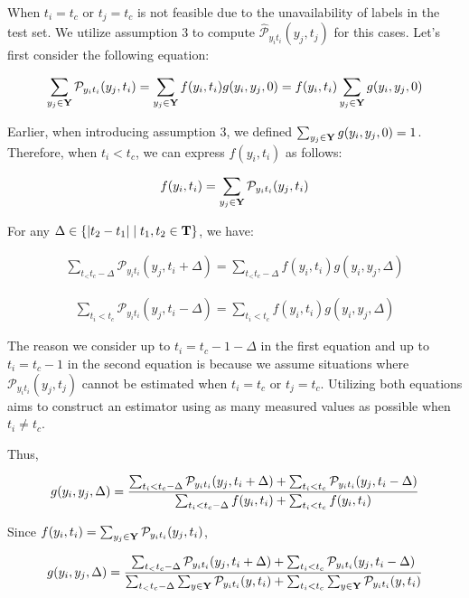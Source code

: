 When $t_i=t_{c}$ or $t_j=t_{c}$ is not feasible due to the unavailability of labels in the test set. We utilize assumption 3 to compute $\hat{\mathcal{P}}_{y_i t_i} (y_j ,t_j)$ for this cases. Let's first consider the following equation:

\begin{align}
\sum_{y_j\in\bold Y}\mathcal{P}_{y_it_i}(y_j, t_i) = \sum_{y_j \in \bold{Y}} f(y_i, t_i)g(y_i, y_j, 0) =f(y_i, t_i)\sum_{y_j \in \bold{Y}}g(y_i, y_j, 0)
\end{align}

Earlier, when introducing assumption 3, we defined $\sum_{y_j \in \bold{Y}}g(y_i, y_j, 0)=1$. Therefore, when $t_i<t_{c}$, we can express $f(y_i, t_i)$ as follows:

\begin{align}
f(y_i, t_i)=\sum_{y_j\in\bold Y}\mathcal{P}_{y_it_i}(y_j, t_i)
\end{align}

For any $\Delta \in \{|t_2 -t_1 | \mid t_1, t_2\in \bold{T}\}$, we have:

\begin{align}
\sum_{t_< t_{c}-\Delta}\mathcal{P}_{y_it_i}(y_j, t_i+\Delta) =\sum_{t_< t_{c}-\Delta}f(y_i, t_i)g(y_i, y_j, \Delta)
\end{align}

\begin{align}
\sum_{t_i<t_{c}}\mathcal{P}_{y_it_i}(y_j, t_i-\Delta) =\sum_{t_i<t_{c}}f(y_i, t_i)g(y_i, y_j, \Delta)
\end{align}

The reason we consider up to $t_i= {t_{c}-1-\Delta}$ in the first equation and up to $t_i = t_{c}-1$ in the second equation is because we assume situations where ${\mathcal{P}}_{y_i t_i} (y_j ,t_j)$ cannot be estimated when $t_i=t_{c}$ or $t_j=t_{c}$. Utilizing both equations aims to construct an estimator using as many measured values as possible when $t_i\neq t_{c}$.

Thus,

\begin{align}
g(y_i, y_j, \Delta)= {\sum_{t_i< t_{c}-\Delta}\mathcal{P}_{y_it_i}(y_j, t_i+\Delta)+\sum_{t_i<t_{c}} \mathcal{P}_{y_it_i}(y_j, t_i-\Delta)\over \sum_{t_i< t_{c}-\Delta}f(y_i, t_i)+\sum_{t_i<t_{c}}f(y_i, t_i)}
\end{align}

Since $f(y_i, t_i)=\sum_{y_j\in\bold Y}\mathcal{P}_{y_it_i}(y_j, t_i)$,

\begin{align}
g(y_i, y_j, \Delta)= {\sum_{t_< t_{c}-\Delta}\mathcal{P}_{y_it_i}(y_j, t_i+\Delta)+\sum_{t_i<t_{c}} \mathcal{P}_{y_it_i}(y_j, t_i-\Delta)\over \sum_{t_< t_{c}-\Delta}\sum_{y\in\bold Y}\mathcal{P}_{y_it_i}(y, t_i)+\sum_{t_i<t_{c}}\sum_{y\in\bold Y}\mathcal{P}_{y_it_i}(y, t_i)}
\end{align}

